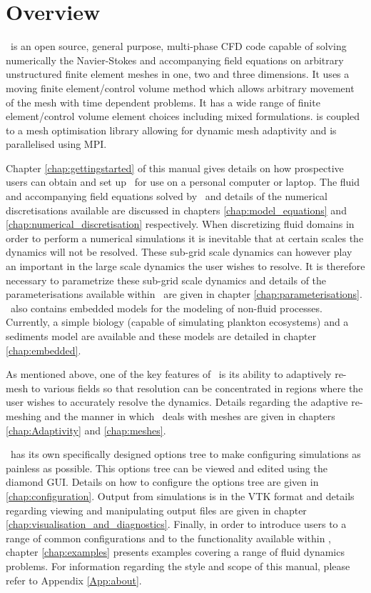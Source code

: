 \chapter*{Overview}

\fluidity\ is an open source, general purpose, multi-phase CFD code capable of solving numerically the Navier-Stokes and accompanying field equations on arbitrary unstructured finite element meshes in one, two and three dimensions. It uses a moving finite element/control volume method which allows arbitrary movement of the mesh with time dependent problems. It has a wide range of finite element/control volume element choices including mixed formulations. \fluidity is coupled to a mesh optimisation library allowing for dynamic mesh adaptivity and is parallelised using MPI.

Chapter \ref{chap:gettingstarted} of this manual gives details on how prospective users can obtain and set up \fluidity\ for use on a personal computer or laptop. The fluid and accompanying field equations solved by \fluidity\ and details of the numerical discretisations available are discussed in chapters \ref{chap:model_equations} and \ref{chap:numerical_discretisation} respectively. When discretizing fluid domains in order to perform a numerical simulations it is inevitable that at certain scales the dynamics will not be resolved. These sub-grid scale dynamics can however play an important in the large scale dynamics the user wishes to resolve. It is therefore necessary to parametrize these sub-grid scale dynamics and details of the parameterisations available within \fluidity\ are given in chapter \ref{chap:parameterisations}. \fluidity\ also contains embedded models for the modeling of non-fluid processes. Currently, a simple biology (capable of simulating plankton ecosystems) and a sediments model are available and these models are detailed in chapter \ref{chap:embedded}.

As mentioned above, one of the key features of \fluidity\ is its ability to adaptively re-mesh to various fields so that resolution can be concentrated in regions where the user wishes to accurately resolve the dynamics. Details regarding the adaptive re-meshing and the manner in which \fluidity\ deals with meshes are given in chapters \ref{chap:Adaptivity} and \ref{chap:meshes}.

\fluidity\ has its own specifically designed options tree to make configuring simulations as painless as possible. This options tree can be viewed and edited using the diamond GUI. Details on how to configure the options tree are given in \ref{chap:configuration}. Output from simulations is in the VTK format and details regarding viewing and manipulating output files are given in chapter \ref{chap:visualisation_and_diagnostics}. Finally, in order to introduce users to a range of common configurations and to the functionality available within \fluidity, chapter \ref{chap:examples} presents examples covering a range of fluid dynamics problems. For information regarding the style and scope of this manual, please refer to Appendix \ref{App:about}.